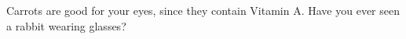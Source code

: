 \documentclass{article}
\begin{document}
Carrots are good for your eyes, since they contain Vitamin A. Have you ever seen a rabbit wearing glasses?
\end{document}
